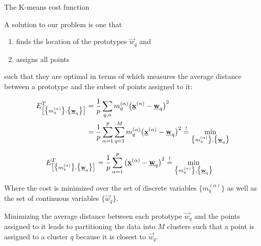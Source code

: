 \begin{frame}{The K-means cost function}

A solution to our problem is one that
\begin{enumerate}
\item finds the location of the prototypes $\vec w_q$ and 
\item assigns all points 
\end{enumerate}
such that they are optimal in terms of 
\pause
which measures the average distance between a prototype and the subset of points assigned to it:

\begin{align}
\label{eq:kmeanscost}
E_{ \big[ \big\{ m_q^{(\alpha)} \big\}, \big\{ \underline{\mathbf{w}}_q \big\} 
		\big] }^T &= \frac{1}{p} \sum\limits_{q,\alpha} m_q^{(\alpha)}
		\big( \underline{\mathbf{x}}^{(\alpha)} - \underline{\mathbf{w}}_q \big)^2\\
        &= \frac{1}{p} \sum_{\alpha=1}^{p} \sum_{q=1}^{M} m_q^{(\alpha)}
		\big( \underline{\mathbf{x}}^{(\alpha)} - \underline{\mathbf{w}}_q \big)^2 \stackrel{\mathrm{!}}{=} \underset{\big\{ m_q^{(\alpha)} \big\}, \big\{ \underline{\mathbf{w}}_q \big\}}{\min}
\end{align}

\begin{align}
\label{eq:kmeanscostsimple}
E_{ \big[ \big\{ m_q^{(\alpha)} \big\}, \big\{ \underline{\mathbf{w}}_q \big\} 
		\big] }^T 
        &= \frac{1}{p} \sum_{\alpha=1}^{p}
		\big( \underline{\mathbf{x}}^{(\alpha)} - \underline{\mathbf{w}}_q \big)^2 \stackrel{\mathrm{!}}{=} \underset{\big\{ m_q^{(\alpha)} \big\}, \big\{ \underline{\mathbf{w}}_q \big\}}{\min}
\end{align}


\notesonly
{
Where the cost is minimized over the set of discrete variables $\big\{ m_q^{(\alpha)} \big\}$ as well as the set of continuous variables $\big\{ \vec{w}_q \big\}$.

Minimizing the average distance between each prototype $\vec w_q$ and the points assigned to it leads to partitioning the data into $M$ clusters such that a point is assigned to a cluster $q$ because it is closest to $\vec w_q$.
}

\end{frame}

